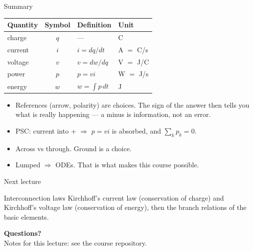 \documentclass[11pt,aspectratio=169]{beamer}
\newcommand{\Icol}[1]{\textcolor{ccur}{#1}}
\newcommand{\Vcol}[1]{\textcolor{cvolt}{#1}}
\newcommand{\Pcol}[1]{\textcolor{cpow}{#1}}
\newcommand{\Qcol}[1]{\textcolor{ccharge}{#1}}
\begin{document}
\begin{frame}{Summary}
  \begin{center}
  \small
  \begin{tabular}{l c l l}
    \toprule
    \textbf{Quantity} & \textbf{Symbol} & \textbf{Definition} & \textbf{Unit}\\
    \midrule
    charge  & \Qcol{$q$} & ---              & C\\
    current & \Icol{$i$} & $i = dq/dt$      & A $=$ C/s\\
    voltage & \Vcol{$v$} & $v = dw/dq$      & V $=$ J/C\\
    power   & \Pcol{$p$} & $p = vi$         & W $=$ J/s\\
    energy  & \Pcol{$w$} & $w = \int p\,dt$ & J\\
    \bottomrule
  \end{tabular}
  \end{center}
  \vfill
  \begin{itemize}
    \item References (arrow, polarity) are \alert{choices}. The \alert{sign} of the answer
          then tells you what is really happening --- a minus is information, not an
          error.
    \item PSC: current into $+$ $\Rightarrow$ $p = vi$ is absorbed, and $\sum_k p_k = 0$.
    \item Across vs through. Ground is a choice.
    \item Lumped $\Rightarrow$ ODEs. That is what makes this course possible.
  \end{itemize}
\end{frame}

\begin{frame}{Next lecture}
  \begin{block}{Interconnection laws}
    Kirchhoff's current law (conservation of charge) and Kirchhoff's voltage law
    (conservation of energy), then the branch relations of the basic elements.
  \end{block}
  \vfill
  \begin{center}
    \Large\color{metured}\textbf{Questions?}\\[6pt]
    \normalsize\normalcolor
    Notes for this lecture: see the course repository.
  \end{center}
\end{frame}
\end{document}
